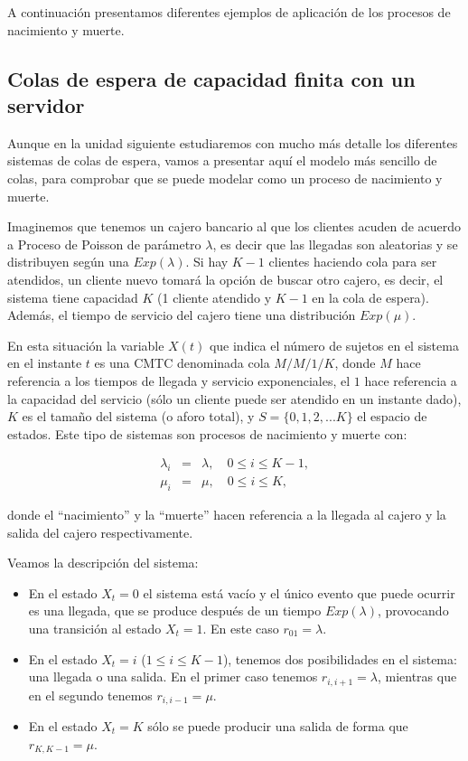 \documentclass[
]{book}
\theoremstyle{definition}
\theoremstyle{definition}
\theoremstyle{definition}
\theoremstyle{definition}
\theoremstyle{remark}
\begin{document}
A continuación presentamos diferentes ejemplos de aplicación de los procesos de nacimiento y muerte.

\hypertarget{colas-de-espera-de-capacidad-finita-con-un-servidor}{%
\subsection{Colas de espera de capacidad finita con un servidor}\label{colas-de-espera-de-capacidad-finita-con-un-servidor}}

Aunque en la unidad siguiente estudiaremos con mucho más detalle los diferentes sistemas de colas de espera, vamos a presentar aquí el modelo más sencillo de colas, para comprobar que se puede modelar como un proceso de nacimiento y muerte.

Imaginemos que tenemos un cajero bancario al que los clientes acuden de acuerdo a Proceso de Poisson de parámetro \(\lambda\), es decir que las llegadas son aleatorias y se distribuyen según una \(Exp(\lambda)\). Si hay \(K-1\) clientes haciendo cola para ser atendidos, un cliente nuevo tomará la opción de buscar otro cajero, es decir, el sistema tiene capacidad \(K\) (1 cliente atendido y \(K-1\) en la cola de espera). Además, el tiempo de servicio del cajero tiene una distribución \(Exp(\mu)\).

En esta situación la variable \(X(t)\) que indica el número de sujetos en el sistema en el instante \(t\) es una CMTC denominada cola \(M/M/1/K\), donde \(M\) hace referencia a los tiempos de llegada y servicio exponenciales, el \(1\) hace referencia a la capacidad del servicio (sólo un cliente puede ser atendido en un instante dado), \(K\) es el tamaño del sistema (o aforo total), y \(S = \{0, 1, 2,...K \}\) el espacio de estados. Este tipo de sistemas son procesos de nacimiento y muerte con:

\begin{eqnarray*}
\lambda_i &=& \lambda, \quad 0 \leq i \leq K-1, \\
\mu_i &=& \mu, \quad 0 \leq i \leq K,
\end{eqnarray*}

donde el ``nacimiento'' y la ``muerte'' hacen referencia a la llegada al cajero y la salida del cajero respectivamente.

Veamos la descripción del sistema:

\begin{itemize}
\item
  En el estado \(X_t=0\) el sistema está vacío y el único evento que puede ocurrir es una llegada, que se produce después de un tiempo \(Exp(\lambda)\), provocando una transición al estado \(X_t=1\). En este caso \(r_{01} = \lambda\).
\item
  En el estado \(X_t=i\) (\(1 \leq i \leq K-1\)), tenemos dos posibilidades en el sistema: una llegada o una salida. En el primer caso tenemos \(r_{i, i+1} = \lambda\), mientras que en el segundo tenemos \(r_{i, i-1} = \mu\).
\item
  En el estado \(X_t=K\) sólo se puede producir una salida de forma que \(r_{K, K-1} = \mu\).
\end{itemize}
\end{document}
